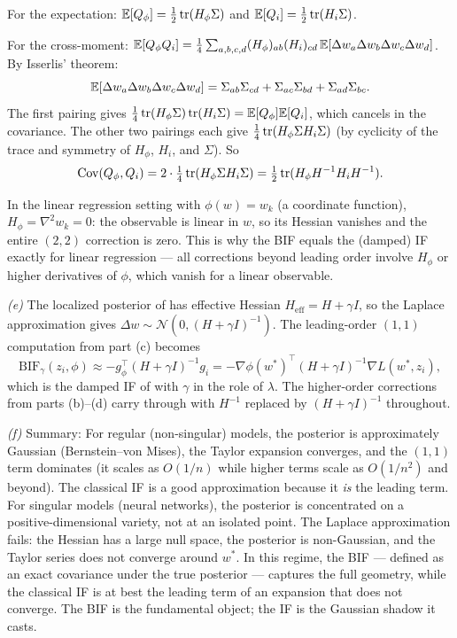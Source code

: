 \begin{solution}
For the expectation: $\mathbb{E}[Q_\phi] = \tfrac12\operatorname{tr}(H_\phi\Sigma)$ and $\mathbb{E}[Q_i] = \tfrac12\operatorname{tr}(H_i\Sigma)$.

For the cross-moment: $\mathbb{E}[Q_\phi Q_i] = \tfrac14\sum_{a,b,c,d}(H_\phi)_{ab}(H_i)_{cd}\,\mathbb{E}[\Delta w_a\Delta w_b\Delta w_c\Delta w_d]$. By Isserlis' theorem:
\[
  \mathbb{E}[\Delta w_a\Delta w_b\Delta w_c\Delta w_d] = \Sigma_{ab}\Sigma_{cd} + \Sigma_{ac}\Sigma_{bd} + \Sigma_{ad}\Sigma_{bc}.
\]
The first pairing gives $\tfrac14\operatorname{tr}(H_\phi\Sigma)\operatorname{tr}(H_i\Sigma) = \mathbb{E}[Q_\phi]\mathbb{E}[Q_i]$, which cancels in the covariance. The other two pairings each give $\tfrac14\operatorname{tr}(H_\phi\Sigma H_i\Sigma)$ (by cyclicity of the trace and symmetry of $H_\phi$, $H_i$, and $\Sigma$). So
\[
  \mathrm{Cov}(Q_\phi,Q_i) = 2\cdot\tfrac14\operatorname{tr}(H_\phi\Sigma H_i\Sigma) = \tfrac12\operatorname{tr}(H_\phi H^{-1}H_i H^{-1}).
\]

In the linear regression setting with $\phi(w) = w_k$ (a coordinate function), $H_\phi = \nabla^2 w_k = 0$: the observable is linear in $w$, so its Hessian vanishes and the entire $(2,2)$ correction is zero. This is why the BIF equals the (damped) IF exactly for linear regression --- all corrections beyond leading order involve $H_\phi$ or higher derivatives of $\phi$, which vanish for a linear observable.

\textit{(e)} The localized posterior of  has effective Hessian $H_{\mathrm{eff}} = H + \gamma I$, so the Laplace approximation gives $\Delta w\sim\mathcal{N}(0,(H+\gamma I)^{-1})$. The leading-order $(1,1)$ computation from part (c) becomes
\[
  \mathrm{BIF}_\gamma(z_i,\phi) \approx -g_\phi^\top(H+\gamma I)^{-1}g_i = -\nabla\phi(w^*)^\top(H+\gamma I)^{-1}\nabla L(w^*,z_i),
\]
which is the damped IF of  with $\gamma$ in the role of $\lambda$. The higher-order corrections from parts (b)--(d) carry through with $H^{-1}$ replaced by $(H+\gamma I)^{-1}$ throughout.

\textit{(f)} Summary: For regular (non-singular) models, the posterior is approximately Gaussian (Bernstein--von Mises), the Taylor expansion converges, and the $(1,1)$ term dominates (it scales as $O(1/n)$ while higher terms scale as $O(1/n^2)$ and beyond). The classical IF is a good approximation because it \emph{is} the leading term. For singular models (neural networks), the posterior is concentrated on a positive-dimensional variety, not at an isolated point. The Laplace approximation fails: the Hessian has a large null space, the posterior is non-Gaussian, and the Taylor series does not converge around $w^*$. In this regime, the BIF --- defined as an exact covariance under the true posterior --- captures the full geometry, while the classical IF is at best the leading term of an expansion that does not converge. The BIF is the fundamental object; the IF is the Gaussian shadow it casts.

\end{solution}

